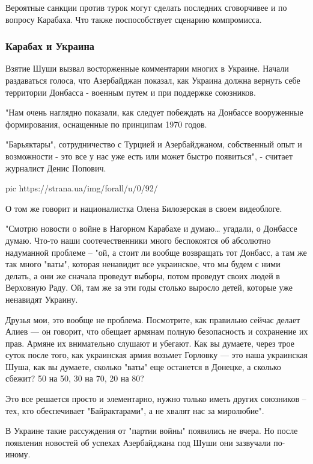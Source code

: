 Вероятные санкции против турок могут сделать последних сговорчивее и по вопросу
Карабаха. Что также поспособствует сценарию компромисса. 

\subsubsection{Карабах и Украина}

Взятие Шуши вызвал восторженные комментарии многих в Украине. Начали
раздаваться голоса, что Азербайджан показал, как Украина должна вернуть себе
территории Донбасса - военным путем и при поддержке союзников.

"Нам очень наглядно показали, как следует побеждать на Донбассе вооруженные
формирования, оснащенные по принципам 1970 годов.

"Барьяктары", сотрудничество с Турцией и Азербайджаном, собственный опыт и
возможности - это все у нас уже есть или может быстро появиться", - считает
журналист Денис Попович.

\ifcmt
pic https://strana.ua/img/forall/u/0/92/%
\fi

О том же говорит и националистка Олена Билозерская в своем видеоблоге. 

"Смотрю новости о войне в Нагорном Карабахе и думаю… угадали, о Донбассе думаю.
Что-то наши соотечественники много беспокоятся об абсолютно надуманной проблеме
– "ой, а стоит ли вообще возвращать тот Донбасс, а там же так много "ваты",
которая ненавидит все украинское, что мы будем с ними делать, а они же сначала
проведут выборы, потом проведут своих людей в Верховную Раду. Ой, там же за эти
годы столько выросло детей, которые уже ненавидят Украину.

Друзья мои, это вообще не проблема. Посмотрите, как правильно сейчас делает
Алиев --- он говорит, что обещает армянам полную безопасность и сохранение их
прав. Армяне их внимательно слушают и убегают. Как вы думаете, через трое суток
после того, как украинская армия возьмет Горловку --- это наша украинская Шуша,
как вы думаете, сколько "ваты" еще останется в Донецке, а сколько сбежит? 50 на
50, 30 на 70, 20 на 80?

Это все решается просто и элементарно, нужно только иметь других союзников –
тех, кто обеспечивает "Байрактарами", а не хвалят нас за миролюбие".


В Украине такие рассуждения от "партии войны" появились не вчера. Но после
появления новостей об успехах Азербайджана под Шуши они зазвучали по-иному.

